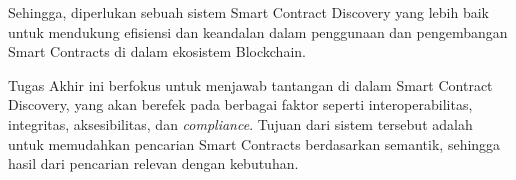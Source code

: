 Sehingga, diperlukan sebuah sistem Smart Contract Discovery yang lebih baik untuk mendukung efisiensi dan keandalan dalam penggunaan dan pengembangan Smart Contracts di dalam ekosistem Blockchain.



Tugas Akhir ini berfokus untuk menjawab tantangan di dalam Smart Contract Discovery, yang akan berefek pada berbagai faktor seperti interoperabilitas, integritas, aksesibilitas, dan \textit{compliance}. Tujuan dari sistem tersebut adalah untuk memudahkan pencarian Smart Contracts berdasarkan semantik, sehingga hasil dari pencarian relevan dengan kebutuhan. 








